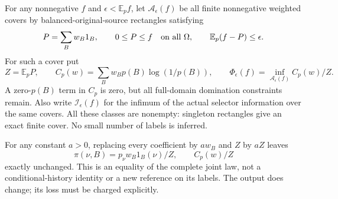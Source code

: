 \documentclass[11pt]{article}
\newcommand{\E}{\mathbb E}
\begin{document}
For any nonnegative $f$ and $\epsilon<\E_pf$, let
$\mathcal A_\epsilon(f)$ be all finite nonnegative weighted covers
by balanced-original-source rectangles satisfying
\[
 P=\sum_Bw_B1_B,\qquad
 0\le P\le f\quad\hbox{on all }\Omega,\qquad
 \E_p(f-P)\le\epsilon .
\]
For such a cover put
\[
 Z=\E_pP,\qquad
 C_p(w)=\sum_Bw_Bp(B)\log(1/p(B)),\qquad
 \Phi_\epsilon(f)=\inf_{\mathcal A_\epsilon(f)}C_p(w)/Z .
                                                        \tag{CT2}
\]
A zero-$p(B)$ term in $C_p$ is zero, but all full-domain domination
constraints remain. Also write $\mathcal I_\epsilon(f)$ for the
infimum of the actual selector information over the same covers.
All these classes are nonempty: singleton rectangles give an exact
finite cover. No small number of labels is inferred.

For any constant $a>0$, replacing every coefficient by $aw_B$
and $Z$ by $aZ$ leaves
\[
 \pi(\nu,B)=p_\nu w_B1_B(\nu)/Z,\qquad C_p(w)/Z
                                                        \tag{CT3}
\]
exactly unchanged. This is an equality of the complete joint law,
not a conditional-history identity or a new reference on its labels.
The output does change; its loss must be charged explicitly.
\end{document}
